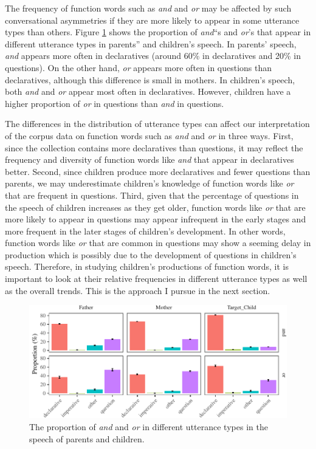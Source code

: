 \documentclass[floatsintext,man]{apa6}
\theoremstyle{definition}
\theoremstyle{definition}
\theoremstyle{definition}
\theoremstyle{remark}
\begin{document}
The frequency of function words such as \emph{and} and \emph{or} may be
affected by such conversational asymmetries if they are more likely to
appear in some utterance types than others. Figure
\ref{fig:CnctPropbySpeechAct} shows the proportion of
\emph{and}\enquote{s and \emph{or}'s that appear in different utterance
types in parents} and children's speech. In parents' speech, \emph{and}
appears more often in declaratives (around 60\% in declaratives and 20\%
in questions). On the other hand, \emph{or} appears more often in
questions than declaratives, although this difference is small in
mothers. In children's speech, both \emph{and} and \emph{or} appear most
often in declaratives. However, children have a higher proportion of
\emph{or} in questions than \emph{and} in questions.

The differences in the distribution of utterance types can affect our
interpretation of the corpus data on function words such as \emph{and}
and \emph{or} in three ways. First, since the collection contains more
declaratives than questions, it may reflect the frequency and diversity
of function words like \emph{and} that appear in declaratives better.
Second, since children produce more declaratives and fewer questions
than parents, we may underestimate children's knowledge of function
words like \emph{or} that are frequent in questions. Third, given that
the percentage of questions in the speech of children increases as they
get older, function words like \emph{or} that are more likely to appear
in questions may appear infrequent in the early stages and more frequent
in the later stages of children's development. In other words, function
words like \emph{or} that are common in questions may show a seeming
delay in production which is possibly due to the development of
questions in children's speech. Therefore, in studying children's
productions of function words, it is important to look at their relative
frequencies in different utterance types as well as the overall trends.
This is the approach I pursue in the next section.

\begin{figure}[tb]

{\centering \includegraphics{figs/CnctPropbySpeechAct-1} 

}

\caption{The proportion of \textit{and} and \textit{or} in different utterance types in the speech of parents and children.}\label{fig:CnctPropbySpeechAct}
\end{figure}
\end{document}
